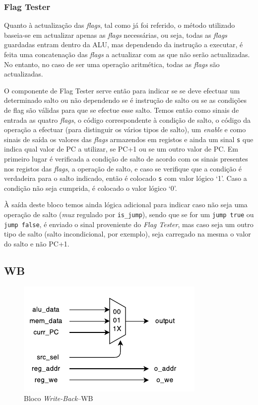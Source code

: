 \documentclass[a4paper]{article}
\begin{document}
			\subsubsection{Flag Tester}
			
				Quanto à actualização das \textit{flags}, tal como já foi referido, o método utilizado baseia-se em actualizar apenas as \textit{flags} necessárias, ou seja, todas as \textit{flags} guardadas entram dentro da ALU, mas dependendo da instrução a executar, é feita uma concatenação das \textit{flags} a actualizar com as que não serão actualizadas. No entanto, no caso de ser uma operação aritmética, todas as \textit{flags} são actualizadas.
			
				O componente de Flag Tester serve então para indicar se se deve efectuar um determinado salto ou não dependendo se é instrução de salto ou se as condições de flag são válidas para que se efectue esse salto. Temos então como sinais de entrada as quatro \textit{flags}, o código correspondente à condição de salto, o código da operação a efectuar (para distinguir os vários tipos de salto), um \textit{enable} e como sinais de saída os valores das \textit{flags} armazendos em registos e ainda um sinal \texttt{s} que indica qual valor de PC a utilizar, se PC+1 ou se um outro valor de PC. Em primeiro lugar é verificada a condição de salto de acordo com os sinais presentes nos registos das \textit{flags}, a operação de salto, e caso se verifique que a condição é verdadeira para o salto indicado, então é colocado \texttt{s} com valor lógico `1'. Caso a condição não seja cumprida, é colocado o valor lógico `0'. 
				
				À saída deste bloco temos ainda lógica adicional para indicar caso não seja uma operação de salto (\textit{mux} regulado por \texttt{is\_jump}), sendo que se for um \texttt{jump true} ou \texttt{jump false}, é enviado o sinal proveniente do \emph{Flag Tester}, mas caso seja um outro tipo de salto (salto incondicional, por exemplo), seja carregado na mesma o valor do salto e não PC+1.
			
				
		\subsection{WB}
		
			\begin{figure}[H]
				\centering
				\includegraphics[width=.8\textwidth]{img/WB}
				\caption{Bloco \textit{Write-Back}--WB}
				\label{fig:wb}
			\end{figure}
			
\end{document}
